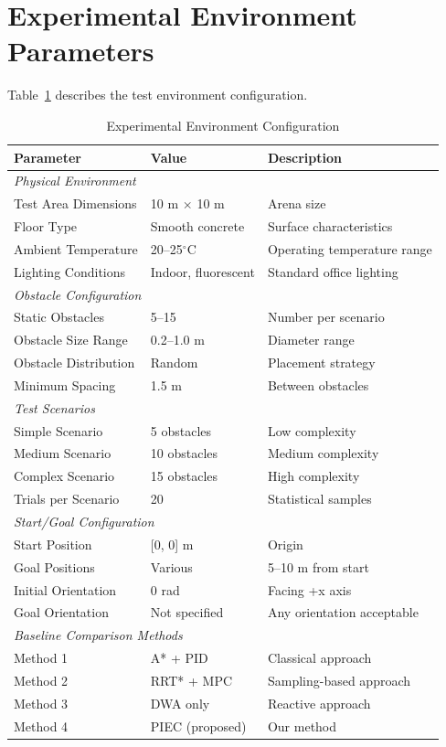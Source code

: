 \clearpage

\section{Experimental Environment Parameters}
\label{sec:environment_params}

Table~\ref{tab:environment_params} describes the test environment configuration.

\begin{table}[htbp]
\centering
\caption{Experimental Environment Configuration}
\label{tab:environment_params}
\begin{tabular}{@{}lll@{}}
\toprule
\textbf{Parameter} & \textbf{Value} & \textbf{Description} \\
\midrule
\multicolumn{3}{l}{\textit{Physical Environment}} \\
Test Area Dimensions & 10 m $\times$ 10 m & Arena size \\
Floor Type & Smooth concrete & Surface characteristics \\
Ambient Temperature & 20--25$^\circ$C & Operating temperature range \\
Lighting Conditions & Indoor, fluorescent & Standard office lighting \\
\midrule
\multicolumn{3}{l}{\textit{Obstacle Configuration}} \\
Static Obstacles & 5--15 & Number per scenario \\
Obstacle Size Range & 0.2--1.0 m & Diameter range \\
Obstacle Distribution & Random & Placement strategy \\
Minimum Spacing & 1.5 m & Between obstacles \\
\midrule
\multicolumn{3}{l}{\textit{Test Scenarios}} \\
Simple Scenario & 5 obstacles & Low complexity \\
Medium Scenario & 10 obstacles & Medium complexity \\
Complex Scenario & 15 obstacles & High complexity \\
Trials per Scenario & 20 & Statistical samples \\
\midrule
\multicolumn{3}{l}{\textit{Start/Goal Configuration}} \\
Start Position & [0, 0] m & Origin \\
Goal Positions & Various & 5--10 m from start \\
Initial Orientation & 0 rad & Facing +x axis \\
Goal Orientation & Not specified & Any orientation acceptable \\
\midrule
\multicolumn{3}{l}{\textit{Baseline Comparison Methods}} \\
Method 1 & A* + PID & Classical approach \\
Method 2 & RRT* + MPC & Sampling-based approach \\
Method 3 & DWA only & Reactive approach \\
Method 4 & PIEC (proposed) & Our method \\
\bottomrule
\end{tabular}
\end{table}

